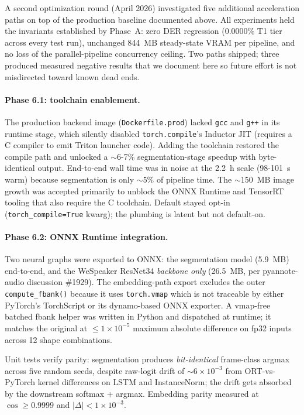 \documentclass[conference,10pt]{IEEEtran}
\begin{document}
A second optimization round (April 2026) investigated five additional
acceleration paths on top of the production baseline documented above.
All experiments held the invariants established by Phase~A: zero
DER regression (0.0000\% T1 tier across every test run), unchanged 844~MB
steady-state VRAM per pipeline, and no loss of the parallel-pipeline
concurrency ceiling. Two paths shipped; three produced measured
negative results that we document here so future effort is not misdirected
toward known dead ends.

\paragraph{Phase 6.1: toolchain enablement.}
The production backend image (\texttt{Dockerfile.prod}) lacked \texttt{gcc}
and \texttt{g++} in its runtime stage, which silently disabled
\texttt{torch.compile}'s Inductor JIT (requires a C compiler to emit Triton
launcher code). Adding the toolchain restored the compile path and unlocked
a $\sim$6-7\% segmentation-stage speedup with byte-identical output.
End-to-end wall time was in noise at the 2.2~h scale (98-101~s warm) because
segmentation is only $\sim$5\% of pipeline time. The $\sim$150~MB image
growth was accepted primarily to unblock the ONNX Runtime and TensorRT
tooling that also require the C toolchain. Default stayed opt-in
(\texttt{torch\_compile=True} kwarg); the plumbing is latent but not
default-on.

\paragraph{Phase 6.2: ONNX Runtime integration.}
Two neural graphs were exported to ONNX: the segmentation model
(5.9~MB) end-to-end, and the WeSpeaker ResNet34 \emph{backbone only}
(26.5~MB, per pyannote-audio discussion \#1929). The embedding-path export
excludes the outer \texttt{compute\_fbank()} because it uses
\texttt{torch.vmap} which is not traceable by either PyTorch's TorchScript
or its dynamo-based ONNX exporter. A vmap-free batched fbank helper was
written in Python and dispatched at runtime; it matches the original at
$\leq 1\times 10^{-5}$ maximum absolute difference on fp32 inputs across
12 shape combinations.

Unit tests verify parity: segmentation produces \emph{bit-identical} frame-class
argmax across five random seeds, despite raw-logit drift of
$\sim 6\times 10^{-3}$ from ORT-vs-PyTorch kernel differences on LSTM and
InstanceNorm; the drift gets absorbed by the downstream softmax + argmax.
Embedding parity measured at $\cos \geq 0.9999$ and
$|\Delta| < 1\times 10^{-3}$.
\end{document}
